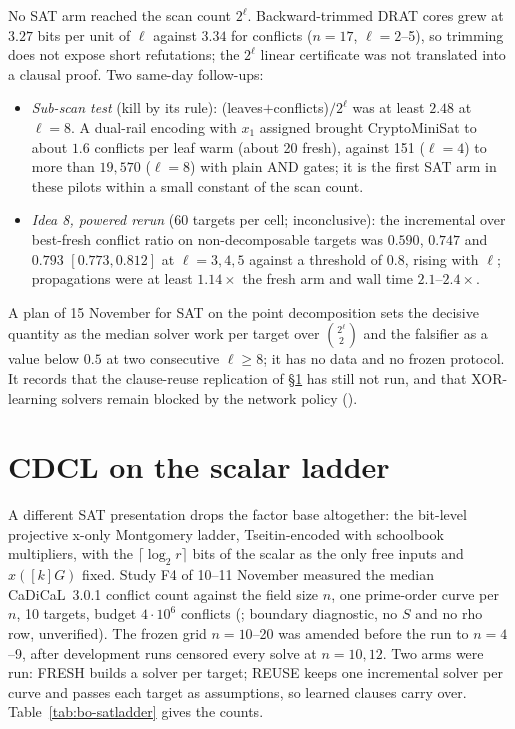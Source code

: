 \noindent No SAT arm reached the scan count $2^\ell$. Backward-trimmed DRAT
cores grew at $3.27$ bits per unit of $\ell$ against $3.34$ for conflicts
($n=17$, $\ell=2$--5), so trimming does not expose short refutations; the
$2^\ell$ linear certificate was not translated into a clausal proof. Two
same-day follow-ups:
\begin{itemize}
\item \emph{Sub-scan test} (kill by its rule): (leaves$+$conflicts)$/2^\ell$
  was at least $2.48$ at $\ell=8$. A dual-rail encoding with $x_1$ assigned
  brought CryptoMiniSat to about $1.6$ conflicts per leaf warm (about 20
  fresh), against 151 ($\ell=4$) to more than $19{,}570$ ($\ell=8$) with plain
  AND gates; it is the first SAT arm in these pilots within a small
  constant of the scan count.
\item \emph{Idea 8, powered rerun} (60 targets per cell; inconclusive):
  the incremental over best-fresh conflict ratio on non-decomposable
  targets was $0.590$, $0.747$ and $0.793$ $[0.773,0.812]$ at $\ell=3,4,5$
  against a threshold of $0.8$, rising with $\ell$; propagations were at
  least $1.14\times$ the fresh arm and wall time $2.1$--$2.4\times$.
\end{itemize}
A plan of 15 November for SAT on the point decomposition sets the decisive
quantity as the median solver work per target over $\binom{2^\ell}{2}$ and
the falsifier as a value below $0.5$ at two consecutive $\ell\ge8$; it has
no data and no frozen protocol. It records that the clause-reuse
replication of \S\ref{sec:bo-satladder} has still not run, and that
XOR-learning solvers remain blocked by the network policy
().

\section{CDCL on the scalar ladder}\label{sec:bo-satladder}

A different SAT presentation drops the factor base altogether: the
bit-level projective x-only Montgomery ladder, Tseitin-encoded with
schoolbook multipliers, with the $\lceil\log_2r\rceil$ bits of the scalar as
the only free inputs and $x([k]G)$ fixed. Study F4 of 10--11 November
measured the median CaDiCaL~3.0.1 conflict count against the field size $n$,
one prime-order curve per $n$, 10 targets, budget $4\cdot10^6$ conflicts
(; boundary diagnostic,
no $S$ and no rho row, unverified). The frozen grid $n=10$--20 was amended
before the run to $n=4$--9, after development runs censored every solve at
$n=10,12$. Two arms were run: FRESH builds a solver per target; REUSE keeps
one incremental solver per curve and passes each target as assumptions, so
learned clauses carry over. Table~\ref{tab:bo-satladder} gives the counts.

